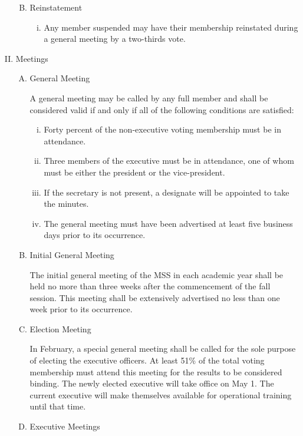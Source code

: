\documentclass[11pt]{article}
\begin{document}
\begin{enumerate}[I.]
\begin{enumerate}[A)]
\begin{enumerate}[i)]
        \end{enumerate}
      \item Reinstatement
        \begin{enumerate}[i)]
          \item Any member suspended may have their membership reinstated
            during a general meeting by a two-thirds vote.
        \end{enumerate}
    \end{enumerate}
  \item Meetings
    \begin{enumerate}[A)]
      \item General Meeting
      
      A general meeting may be called by any full member and shall be
        considered valid if and only if all of the following conditions are
        satisfied:
        \begin{enumerate}[i)]
          \item Forty percent of the non-executive voting membership must be in
            attendance. 
          \item Three members of the executive must be in attendance, one of
            whom must be either the president or the vice-president.
          \item If the secretary is not present, a designate will be appointed
            to take the minutes. 
          \item The general meeting must have been advertised at least five
            business days prior to its occurrence.
        \end{enumerate}
      \item Initial General Meeting
      
      The initial general meeting of the MSS in each academic year shall be
        held no more than three weeks after the commencement of the fall
        session. This meeting shall be extensively advertised no less than one
        week prior to its occurrence. 
      \item Election Meeting
      
      In February, a special general meeting shall be called for the sole
        purpose of electing the executive officers. At least 51\% of the total
        voting membership must attend this meeting for the results to be
        considered binding. The newly elected executive will take office on May
        1. The current executive will make themselves available for operational
        training until that time. 
      \item Executive Meetings
      

\end{enumerate}
\end{enumerate}
\end{document}
